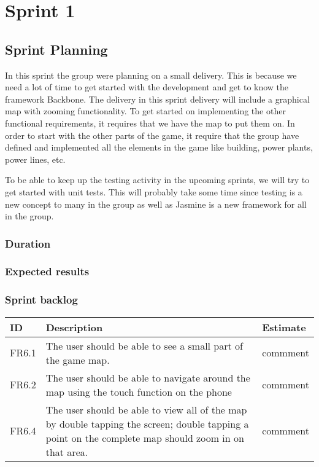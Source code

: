 \section{Sprint 1}

\subsection{Sprint Planning}
	In this sprint the group were planning on a small delivery. This is because we need a lot of time to get started with the development and get to know the framework Backbone. The delivery in this sprint delivery will include a graphical map with zooming functionality. To get started on implementing the other functional requirements, it requires that we have the map to put them on. 
	In order to start with the other parts of the game, it require that the group have defined and implemented all the elements in the game like building, power plants, power lines, etc.

	To be able to keep up the testing activity in the upcoming sprints, we will try to get started with unit tests. This will probably take some time since testing is a new concept to many in the group as well as Jasmine is a new framework for all in the group. 

\subsubsection{Duration}

\subsubsection{Expected results}


\subsubsection{Sprint backlog}
\begin{tabular}{| p{1cm} | p{8cm} | p{3cm} |}
	\hline
	ID & Description & Estimate \\ \hline
	FR6.1 & The user should be able to see a small part of the game map. & commment \\ \hline
	FR6.2 & The user should be able to navigate around the map using the touch function on the phone & commment \\ \hline
	FR6.4 & The user should be able to view all of the map by double tapping the screen; double tapping a point on the complete map should zoom in on that area. & commment \\
	\hline
\end{tabular}

